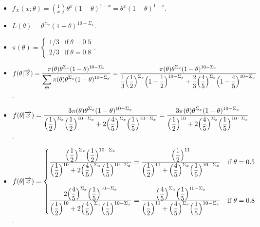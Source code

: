 \documentclass[12pt]{article}
\newcommand{\ds}{\displaystyle}
\begin{document}
\begin{itemize}
    \item $ \ds f_X(x ; \theta) = \binom{1}{x} \theta^{x} (1 - \theta)^{1 - x} = \theta^{x} (1 - \theta)^{1 - x} $. \\
    \item $ \ds L(\theta) = \theta^{\Sigma_{x}} (1 - \theta)^{10 - \Sigma_{x}} $. \\
    \item $ \ds \pi(\theta) = \begin{cases} 
        1/3 & \text{if} \ \theta = 0.5 \\
        2/3 & \text{if} \ \theta = 0.8
    \end{cases} $. \\ 
    \item $ \ds f(\theta | \overrightarrow{x}) = \frac{ \ds \pi(\theta) \theta^{\Sigma_{x}} (1 - \theta)^{10 - \Sigma_{x}} }{ \ds \sum_{\Theta} \pi(\theta) \theta^{\Sigma_{x}} (1 - \theta)^{10 - \Sigma_{x}} } = 
    \frac{ \ds \pi(\theta) \theta^{\Sigma_{x}} (1 - \theta)^{10 - \Sigma_{x}} }{ \ds \frac{1}{3} \Bigl( \frac{1}{2} \Bigr)^{\Sigma_{x}} \Bigl( 1 - \frac{1}{2} \Bigr)^{10 - \Sigma_{x}} + \frac{2}{3} \Bigl( \frac{4}{5} \Bigr)^{\Sigma_{x}} \Bigl( 1 - \frac{4}{5} \Bigr)^{10 - \Sigma_{x}} } $. \\ 
    \item $ \ds f(\theta | \overrightarrow{x}) = \frac{ \ds 3 \pi(\theta) \theta^{\Sigma_{x}} (1 - \theta)^{10 - \Sigma_{x}} }{ \ds \Bigl( \frac{1}{2} \Bigr)^{\Sigma_{x}} \Bigl( \frac{1}{2} \Bigr)^{10 - \Sigma_{x}} + 2 \Bigl( \frac{4}{5} \Bigr)^{\Sigma_{x}} \Bigl( \frac{1}{5} \Bigr)^{10 - \Sigma_{x}} } = 
    \frac{ \ds 3 \pi(\theta) \theta^{\Sigma_{x}} (1 - \theta)^{10 - \Sigma_{x}} }{ \ds \Bigl( \frac{1}{2} \Bigr)^{10} + 2 \Bigl( \frac{4}{5} \Bigr)^{\Sigma_{x}} \Bigl( \frac{1}{5} \Bigr)^{10 - \Sigma_{x}} } $. \\  \vspace{2.5mm} 
    \item $ \ds f(\theta | \overrightarrow{x}) = \begin{cases} 
        \frac{ \ds \Bigl( \frac{1}{2} \Bigr)^{\Sigma_{x}} \Bigl( \frac{1}{2} \Bigr)^{10 - \Sigma_{x}} }{ \ds \Bigl( \frac{1}{2} \Bigr)^{10} + 2 \Bigl( \frac{4}{5} \Bigr)^{\Sigma_{x}} \Bigl( \frac{1}{5} \Bigr)^{10 - \Sigma_{x}} } = 
        \frac{ \ds \Bigl( \frac{1}{2} \Bigr)^{11} }{ \ds \Bigl( \frac{1}{2} \Bigr)^{11} + \Bigl( \frac{4}{5} \Bigr)^{\Sigma_{x}} \Bigl( \frac{1}{5} \Bigr)^{10 - \Sigma_{x}} } & \text{if} \ \theta = 0.5 \\
        \ & \ \\
        \frac{ \ds 2 \Bigl( \frac{4}{5} \Bigr)^{\Sigma_{x}} \Bigl( \frac{1}{5} \Bigr)^{10 - \Sigma_{x}} }{ \ds \Bigl( \frac{1}{2} \Bigr)^{10} + 2 \Bigl( \frac{4}{5} \Bigr)^{\Sigma_{x}} \Bigl( \frac{1}{5} \Bigr)^{10 - \Sigma_{x}} } = 
        \frac{ \ds \Bigl( \frac{4}{5} \Bigr)^{\Sigma_{x}} \Bigl( \frac{1}{5} \Bigr)^{10 - \Sigma_{x}} }{ \ds \Bigl( \frac{1}{2} \Bigr)^{11} + \Bigl( \frac{4}{5} \Bigr)^{\Sigma_{x}} \Bigl( \frac{1}{5} \Bigr)^{10 - \Sigma_{x}} } & \text{if} \ \theta = 0.8
    \end{cases} $. \\ 
\end{itemize}
\end{document}
